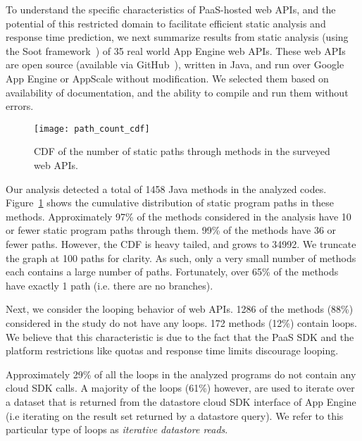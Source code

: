 
To understand the specific characteristics of PaaS-hosted web APIs, and the potential
of this restricted domain to facilitate efficient static analysis and response time 
prediction,  we next summarize results from static analysis (using the Soot
framework~\cite{Vallee-Rai:2010:SJB:1925805.1925818}) of 
35 real world App Engine web APIs. These web APIs are open 
source (available via GitHub~\cite{github}), written in Java, and run over Google App Engine or 
AppScale without modification.
We selected them based on availability of documentation, and the ability 
to compile and run them without errors.

\begin{figure}
\centering
\texttt{[image: path\_count\_cdf]}
\caption{CDF of the number of static paths through methods in the surveyed web APIs.
\label{fig:path_count_cdf}
}
\end{figure}

Our analysis detected a total of 1458 Java methods in the analyzed codes.
Figure~\ref{fig:path_count_cdf} shows the cumulative distribution of 
static program paths in these methods.
Approximately 97\% of the methods considered in the analysis have 10 or fewer 
static program paths through them.  99\% of 
the methods have 36 or fewer paths.
However, the CDF is heavy tailed, and grows to 34992.
We truncate the graph at 100 paths for clarity. As such, 
only a very small number of methods 
each contains a large number of paths.
Fortunately, over 65\% of the methods have exactly 1 path (i.e. there are no branches).

Next, we consider the looping behavior of web APIs.  1286 of the methods (88\%)
considered in the study
do not have any loops. 172 methods (12\%) contain loops. 
We believe that this characteristic is due to the fact that 
the PaaS SDK and the platform restrictions like quotas and response time limits 
discourage looping.

Approximately 29\% of all the loops in 
the analyzed programs do not contain any cloud SDK calls. 
A majority of the loops (61\%) however, are
used to iterate over a dataset that is returned from the datastore cloud SDK interface 
of App Engine (i.e iterating on the result set 
returned by a datastore query). We refer to this particular type of 
loops as \textit{iterative datastore reads}. 

